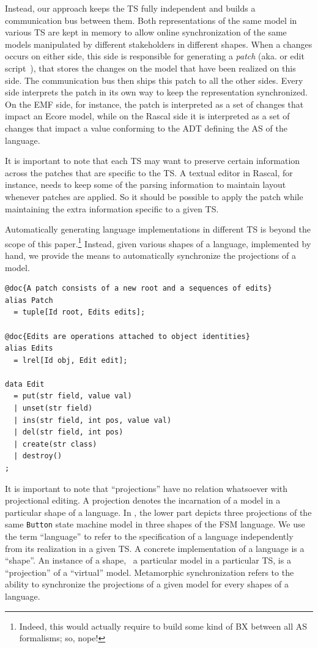 \documentclass[sigplan]{acmart}
\begin{document}
Instead, our approach keeps the TS fully independent and builds a communication bus between them.
Both representations of the same model in various TS are kept in memory to allow online synchronization of the same models manipulated by different stakeholders in different shapes.
When a changes occurs on either side, this side is responsible for generating a \emph{patch} (aka. \de or edit script~\cite{rozen2017towards}), that stores the changes on the model that have been realized on this side.
The communication bus then ships this patch to all the other sides.
Every side interprets the patch in its own way to keep the representation synchronized.
On the EMF side, for instance, the patch is interpreted as a set of changes that impact an Ecore model, while on the Rascal side it is interpreted as a set of changes that impact a value conforming to the ADT defining the AS of the language.

It is important to note that each TS may want to preserve certain information across the patches that are specific to the TS.
A textual editor in Rascal, for instance, needs to keep some of the parsing information to maintain layout whenever patches are applied.
So it should be possible to apply the patch while maintaining the extra information specific to a given TS.

Automatically generating language implementations in different TS is beyond the scope of this paper.\footnote{Indeed, this would actually require to build some kind of BX between all AS formalisms; so, nope!} Instead, given various shapes of a language, implemented by hand, we provide the means to automatically synchronize the projections of a model.

\begin{lstlisting}[label=lst:delta-adt, caption={CRUD-like \ds structure definition in Rascal}, language=Rascal]
@doc{A patch consists of a new root and a sequences of edits}
alias Patch
  = tuple[Id root, Edits edits];

@doc{Edits are operations attached to object identities}
alias Edits
  = lrel[Id obj, Edit edit];

data Edit
  = put(str field, value val)
  | unset(str field)
  | ins(str field, int pos, value val)
  | del(str field, int pos)
  | create(str class) 
  | destroy() 
;
\end{lstlisting}

It is important to note that ``projections'' have no relation whatsoever with projectional editing.
A projection denotes the incarnation of a model in a particular shape of a language.
In , the lower part depicts three projections of the same \texttt{Button} state machine model in three shapes of the FSM language.
We use the term ``language'' to refer to the specification of a language independently from its realization in a given TS.
A concrete implementation of a language is a ``shape''.
An instance of a shape, \ie~a particular model in a particular TS, is a ``projection'' of a ``virtual'' model.
Metamorphic synchronization refers to the ability to synchronize the projections of a given model for every shapes of a language.
\end{document}
